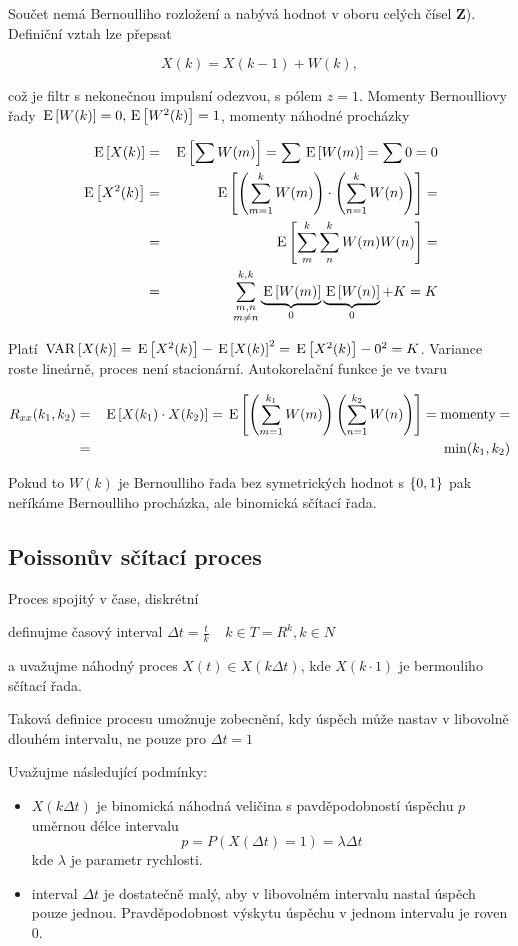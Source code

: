 Součet nemá Bernoulliho rozložení a nabývá hodnot v oboru celých čísel \textbf{Z}). Definiční vztah lze přepsat

\[ X(k) =X(k-1)+W(k), \]

což je filtr s nekonečnou impulsní odezvou, s pólem $z=1$. Momenty Bernoulliovy řady $\,\mathrm{E}\left[W(k)\right]=0,\,\mathrm{E}\left[W^2(k)\right]=1$, momenty náhodné procházky

\begin{eqnarray*}
\,\mathrm{E}\left[X(k)\right] & = & \,\mathrm{E}\left[\sum W(m)\right] =  \sum \,\mathrm{E}\left[W(m)\right] = \sum 0 = 0\\
\,\mathrm{E}\left[X^2(k)\right] & = & \,\mathrm{E}\left[\left(\sum_{m=1}^k W(m)\right)\cdot\left(\sum_{n=1}^k W(n)\right)\right]=\\
& = & \,\mathrm{E}\left[\sum_m^k\sum_n^k W(m)W(n)\right]=\\
& = & \sum^{k,k}_{\substack{m,n\\m\neq n}}\underbrace{\,\mathrm{E}\left[W(m)\right]}_0 \underbrace{\,\mathrm{E}\left[W(n)\right]}_0+K = K
\end{eqnarray*}

Platí $\,\mathrm{VAR}\left[X(k)\right]= \,\mathrm{E}\left[X^2(k)\right] - \,\mathrm{E}\left[X(k)\right]^2 = \,\mathrm{E}\left[X^2(k)\right] - 0^2 =  K$. Variance roste lineárně, proces není stacionární. Autokorelační funkce je ve tvaru

\begin{eqnarray*}
R_{xx}(k_1,k_2) &=& \,\mathrm{E}\left[X(k_1)\cdot X(k_2)\right]=\,\mathrm{E}\left[\left(\sum_{m=1}^{k_1}W(m)\right)\left(\sum_{n=1}^{k_2}W(n)\right)\right]=\text{momenty}=\\
& = & \min(k_1,k_2)
\end{eqnarray*}

Pokud to $W(k)$ je Bernoulliho řada bez symetrických hodnot s $ \left\{0,1\right\} $ pak neříkáme Bernoulliho procházka, ale binomická sčítací řada.



\subsection{Poissonův sčítací proces}

Proces spojitý v čase, diskrétní

definujme časový interval $ \Delta t = \frac{t}{k} \;\;\;\; k \in T = R^k, k \in N$

a uvažujme náhodný proces $X(t) \in X(k \Delta t)$, kde $X(k \cdot 1)$ je bermouliho sčítací řada.

Taková definice procesu umožnuje zobecnění, kdy úspěch může nastav v libovolně dlouhém intervalu, ne pouze pro $ \Delta t = 1$

Uvažujme následující podmínky:
\begin{itemize}
	\item $X(k \Delta t)$ je binomická náhodná veličina s pavděpodobností úspěchu $p$ uměrnou délce intervalu $$ p =P (X(\Delta t) = 1) = \lambda \Delta t$$ kde $\lambda$ je parametr rychlosti.
	\item interval $\Delta t$ je dostatečně malý, aby v libovolném intervalu nastal úspěch pouze jednou. Pravděpodobnost výskytu úspěchu v jednom intervalu je roven $0$.
\end{itemize}

